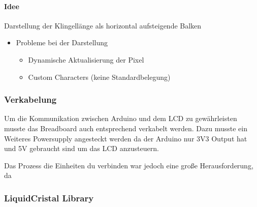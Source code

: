 \documentclass{scrartcl}
\begin{document}
\paragraph{Idee} Darstellung der Klingellänge als horizontal aufsteigende Balken
\begin{itemize}
\item Probleme bei der Darstellung
\begin{itemize}
\item Dynamische Aktualisierung der Pixel
\item Custom Characters (keine Standardbelegung)
\end{itemize}
\end{itemize}


\subsubsection{Verkabelung}


Um die Kommunikation zwischen Arduino und dem LCD zu gewährleisten musste das Breadboard auch entsprechend verkabelt werden. Dazu musste ein Weiteres Powersupply angesteckt werden da der Arduino nur 3V3 Output hat und 5V gebraucht sind um das LCD anzusteuern.

Das Prozess die Einheiten du verbinden war jedoch eine große Herausforderung, da 


\subsubsection{LiquidCristal Library}

%
%
\end{document}
